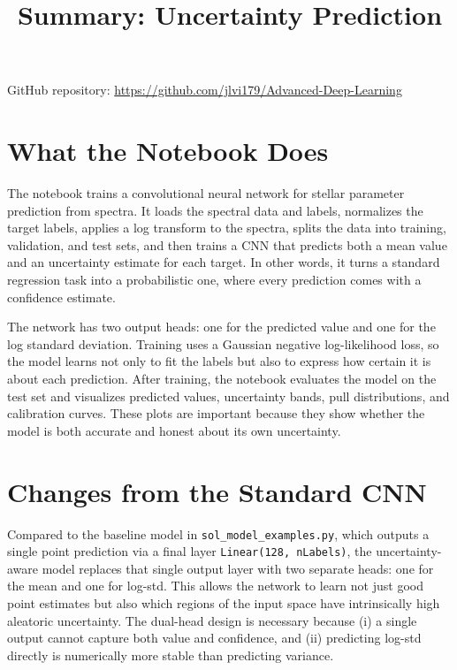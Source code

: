 \documentclass[11pt,a4paper]{article}
\title{Summary: Uncertainty Prediction}
\author{}
\date{}
\begin{document}
\maketitle

\noindent GitHub repository: \href{https://github.com/jlvi179/Advanced-Deep-Learning}{https://github.com/jlvi179/Advanced-Deep-Learning}

\section*{What the Notebook Does}

The notebook trains a convolutional neural network for stellar parameter prediction from spectra. It loads the spectral data and labels, normalizes the target labels, applies a log transform to the spectra, splits the data into training, validation, and test sets, and then trains a CNN that predicts both a mean value and an uncertainty estimate for each target. In other words, it turns a standard regression task into a probabilistic one, where every prediction comes with a confidence estimate.

The network has two output heads: one for the predicted value and one for the log standard deviation. Training uses a Gaussian negative log-likelihood loss, so the model learns not only to fit the labels but also to express how certain it is about each prediction. After training, the notebook evaluates the model on the test set and visualizes predicted values, uncertainty bands, pull distributions, and calibration curves. These plots are important because they show whether the model is both accurate and honest about its own uncertainty.

\section*{Changes from the Standard CNN}

Compared to the baseline model in \texttt{sol\_model\_examples.py}, which outputs a single point prediction via a final layer \texttt{Linear(128, nLabels)}, the uncertainty-aware model replaces that single output layer with two separate heads: one for the mean and one for log-std. This allows the network to learn not just good point estimates but also which regions of the input space have intrinsically high aleatoric uncertainty. The dual-head design is necessary because (i) a single output cannot capture both value and confidence, and (ii) predicting log-std directly is numerically more stable than predicting variance.
\end{document}
